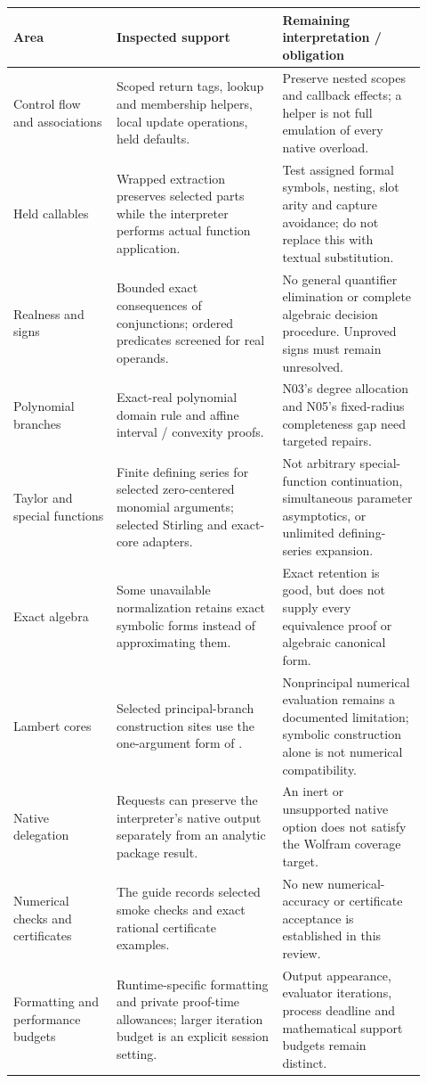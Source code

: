 \documentclass[11pt,a4paper]{article}
\newcommand{\code}[1]{\texttt{\detokenize{#1}}}
\begin{document}
\begin{longtable}{@{}P{0.23\linewidth}P{0.37\linewidth}P{0.32\linewidth}@{}}
\toprule
Area & Inspected support & Remaining interpretation / obligation \\
\midrule
\endhead
Control flow and associations & Scoped return tags, lookup and membership helpers, local update operations, held defaults. & Preserve nested scopes and callback effects; a helper is not full emulation of every native overload. \cite{mathicscompat} \\
Held callables & Wrapped extraction preserves selected parts while the interpreter performs actual function application. & Test assigned formal symbols, nesting, slot arity and capture avoidance; do not replace this with textual substitution. \cite{mathicscalls,mathicscallables} \\
Realness and signs & Bounded exact consequences of conjunctions; ordered predicates screened for real operands. & No general quantifier elimination or complete algebraic decision procedure. Unproved signs must remain unresolved. \cite{mathicsassumptions,mathicssimplify} \\
Polynomial branches & Exact-real polynomial domain rule and affine interval / convexity proofs. & N03's degree allocation and N05's fixed-radius completeness gap need targeted repairs. \cite{mathicsbranches} \\
Taylor and special functions & Finite defining series for selected zero-centered monomial arguments; selected Stirling and exact-core adapters. & Not arbitrary special-function continuation, simultaneous parameter asymptotics, or unlimited defining-series expansion. \cite{mathicstaylor,mathicsspecial} \\
Exact algebra & Some unavailable normalization retains exact symbolic forms instead of approximating them. & Exact retention is good, but does not supply every equivalence proof or algebraic canonical form. \cite{mathicscompat} \\
Lambert cores & Selected principal-branch construction sites use the one-argument form of \code{ProductLog}. & Nonprincipal numerical evaluation remains a documented limitation; symbolic construction alone is not numerical compatibility. \cite{mathicscore,mathicsguide} \\
Native delegation & Requests can preserve the interpreter's native output separately from an analytic package result. & An inert \code{Asymptotic} or unsupported native option does not satisfy the Wolfram coverage target. \cite{native,mathicsguide} \\
Numerical checks and certificates & The guide records selected smoke checks and exact rational certificate examples. & No new numerical-accuracy or certificate acceptance is established in this review. \cite{mathicsguide} \\
Formatting and performance budgets & Runtime-specific formatting and private proof-time allowances; larger iteration budget is an explicit session setting. & Output appearance, evaluator iterations, process deadline and mathematical support budgets remain distinct. \cite{mathicsguide,mathicstime} \\
\bottomrule
\end{longtable}
\end{document}
